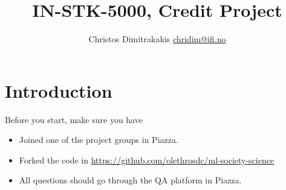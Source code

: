 \documentclass[a4paper,twoside]{article}
\title{IN-STK-5000, Credit Project}
\author{Christos Dimitrakakis \url{chridim@ifi.no}}
\begin{document}
\maketitle
\section{Introduction}
Before you start, make sure you have
\begin{itemize}
\item Joined one of the project groups in Piazza.
\item Forked the code in \url{https://github.com/olethrosdc/ml-society-science}
\item All questions should go through the QA platform in Piazza.
\end{itemize}


%
%
\end{document}
